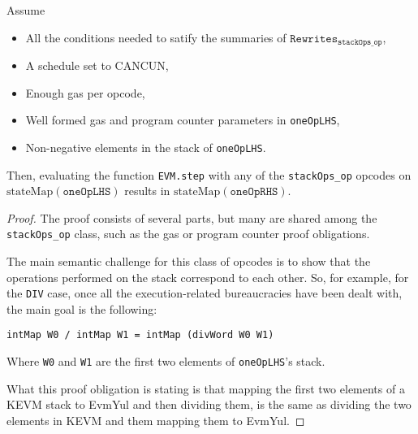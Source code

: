 \begin{theorem}\label{thm:step_oneOp}
\leanok
{}

Assume

\begin{itemize}
\item All the conditions needed to satify the summaries of
  $\texttt{Rewrites}_{\texttt{stackOps_op}}$,
\item A schedule set to CANCUN,
\item Enough gas per opcode,
\item Well formed gas and program counter parameters in \texttt{oneOpLHS},
\item Non-negative elements in the stack of \texttt{oneOpLHS}.
\end{itemize}

Then, evaluating the function \texttt{EVM.step} with any of the
\texttt{stackOps_op} opcodes on $\text{stateMap}(\texttt{oneOpLHS})$ results in
$\text{stateMap}(\texttt{oneOpRHS})$.

\end{theorem}

\begin{proof}

The proof consists of several parts, but many are shared among the
\texttt{stackOps_op} class, such as the gas or program counter proof
obligations.

The main semantic challenge for this class of opcodes is to show that the
operations performed on the stack correspond to each other. So, for example, for
the \texttt{DIV} case, once all the execution-related bureaucracies have been
dealt with, the main goal is the following:

\begin{verbatim}
intMap W0 / intMap W1 = intMap (divWord W0 W1)
\end{verbatim}

Where \texttt{W0} and \texttt{W1} are the first two elements of
\texttt{oneOpLHS}'s stack.

What this proof obligation is stating is that mapping the first two elements of
a KEVM stack to EvmYul and then dividing them, is the same as dividing the two
elements in KEVM and them mapping them to EvmYul.

\end{proof}

